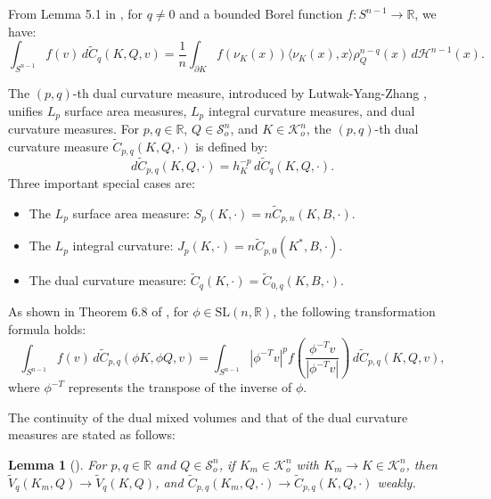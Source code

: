 \documentclass[12pt, reqno]{amsart}
\newtheorem{lemma}[theorem]{Lemma}
\theoremstyle{definition}
\theoremstyle{remark}
\numberwithin{equation}{section}
\begin{document}
	From Lemma 5.1 in \cite{lyz2018}, for $q \neq 0$ and a bounded Borel function $f : S^{n-1} \to \mathbb{R}$, we have:
	\begin{equation}
	\int_{S^{n-1}} f(v) \, d\widetilde{C}_q(K, Q, v) = \frac{1}{n} \int_{\partial K} f(\nu_K(x)) \langle \nu_K(x), x \rangle \rho_Q^{n-q}(x) \, d\mathcal{H}^{n-1}(x).
	\end{equation}

	
The $(p,q)$-th dual curvature measure, introduced by Lutwak-Yang-Zhang \cite{lyz2018}, unifies $L_p$ surface area measures, $L_p$ integral curvature measures, and dual curvature measures. For $p, q \in \mathbb{R}$, $Q \in \mathcal{S}_o^n$, and $K \in \mathcal{K}_o^n$, the $(p,q)$-th dual curvature measure  $\widetilde{C}_{p,q}(K, Q, \cdot)$ is defined by:
		\begin{equation}\label{pqdef}
	d\widetilde{C}_{p,q}(K, Q, \cdot) = h_K^{-p} \, d\widetilde{C}_q(K, Q, \cdot).
	\end{equation}
		Three important special cases are:
	\begin{itemize}
		\item The $L_p$ surface area measure: $S_p(K, \cdot) = n\widetilde{C}_{p,n}(K, B, \cdot)$.
		\item The $L_p$ integral curvature: $J_p(K, \cdot) = n\widetilde{C}_{p,0}(K^*, B, \cdot)$.
		\item The dual curvature measure: $\widetilde{C}_{q}(K,  \cdot)=\widetilde{C}_{0,q}(K, B, \cdot)$.
	\end{itemize}
 As shown in Theorem 6.8 of \cite{lyz2018}, for $\phi \in \text{SL}(n, \mathbb{R})$, the following transformation formula holds:
\begin{equation}\label{measure trans}
	\int_{S^{n-1}} f(v) \, d\widetilde{C}_{p,q}(\phi K, \phi Q, v) = \int_{S^{n-1}} |\phi^{-T}v|^{p} f \left( \frac{\phi^{-T}v}{|\phi^{-T}v|} \right) \, d\widetilde{C}_{p,q}(K, Q, v),
\end{equation}
where $\phi^{-T}$ represents the transpose of the inverse of $\phi$.	
	
	The continuity of the dual mixed volumes and that of the dual curvature measures  are stated as follows:
	
	
	\begin{lemma}[\cite{lyz2018}]\label{continuity}
		For $p,q \in \mathbb{R}$ and $Q \in \mathcal{S}^{n}_o$, if $K_m \in \mathcal{K}^{n}_{o}$ with $K_m \to K \in \mathcal{K}^{n}_{o}$, then
		$\widetilde{V}_q(K_m,Q) \to \widetilde{V}_q(K,Q)$, and $\widetilde{C}_{p,q}(K_m,Q,\cdot) \to \widetilde{C}_{p,q}(K,Q,\cdot)$ weakly.
	\end{lemma}
	
\end{document}
